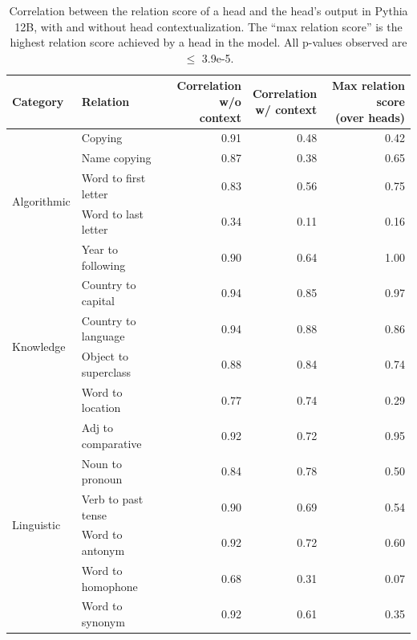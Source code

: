 \documentclass[11pt]{article}
\newcommand{\PythiaTwelveB}{Pythia 12B}
\begin{document}
\begin{table}[p]
\centering
\footnotesize

\begin{tabular}{llrrr}
\toprule
Category & Relation & \makecell{Correlation\\w/o context} & \makecell{Correlation\\w/ context} & \makecell{Max relation score\\(over heads)} \\
\midrule
\multirow{5}{*}{Algorithmic} & Copying & 0.91 &  0.48 & 0.42 \\
 & Name copying & 0.87 &  0.38 & 0.65 \\
 & Word to first letter & 0.83 &  0.56 & 0.75 \\
 & Word to last letter & 0.34 &  0.11 &  0.16 \\
 & Year to following & 0.90 &  0.64 & 1.00 \\
\midrule
\multirow{4}{*}{Knowledge} & Country to capital & 0.94 &  0.85 &  0.97 \\
 & Country to language & 0.94 &  0.88 &  0.86 \\
 & Object to superclass & 0.88 &  0.84 &  0.74 \\
 & Word to location & 0.77  & 0.74 &  0.29 \\
\midrule
\multirow{6}{*}{Linguistic} & Adj to comparative & 0.92 &  0.72  & 0.95 \\
 & Noun to pronoun & 0.84 &  0.78 &  0.50 \\
 & Verb to past tense & 0.90 &  0.69  & 0.54 \\
 & Word to antonym & 0.92 &  0.72 & 0.60 \\
 & Word to homophone & 0.68 & 0.31 &  0.07 \\
 & Word to synonym & 0.92 &  0.61 & 0.35 \\
\bottomrule
\end{tabular}

\caption{Correlation between the relation score of a head and the head's output in \PythiaTwelveB{}, with and without head contextualization. The ``max relation score'' is the highest relation score achieved by a head in the model. All p-values observed are $\leq$ 3.9e-5.} 
\label{tab:Dynamic_results_pythia_12b}
\end{table}
\end{document}
